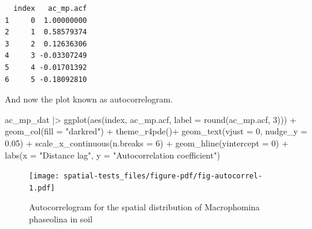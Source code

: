 \documentclass[
  letterpaper,
]{book}
\newenvironment{Shaded}{\begin{snugshade}}{\end{snugshade}}
\newcommand{\AttributeTok}[1]{\textcolor[rgb]{0.40,0.45,0.13}{#1}}
\newcommand{\DecValTok}[1]{\textcolor[rgb]{0.68,0.00,0.00}{#1}}
\newcommand{\FloatTok}[1]{\textcolor[rgb]{0.68,0.00,0.00}{#1}}
\newcommand{\FunctionTok}[1]{\textcolor[rgb]{0.28,0.35,0.67}{#1}}
\newcommand{\NormalTok}[1]{\textcolor[rgb]{0.00,0.23,0.31}{#1}}
\newcommand{\OtherTok}[1]{\textcolor[rgb]{0.00,0.23,0.31}{#1}}
\newcommand{\SpecialCharTok}[1]{\textcolor[rgb]{0.37,0.37,0.37}{#1}}
\newcommand{\StringTok}[1]{\textcolor[rgb]{0.13,0.47,0.30}{#1}}
\begin{document}
\begin{Shaded}
\end{Shaded}

\begin{verbatim}
  index   ac_mp.acf
1     0  1.00000000
2     1  0.58579374
3     2  0.12636306
4     3 -0.03307249
5     4 -0.01701392
6     5 -0.18092810
\end{verbatim}

And now the plot known as autocorrelogram.

\begin{Shaded}
\begin{Highlighting}[]
\NormalTok{ac\_mp\_dat }\SpecialCharTok{|\textgreater{}}
  \FunctionTok{ggplot}\NormalTok{(}\FunctionTok{aes}\NormalTok{(index, ac\_mp.acf, }\AttributeTok{label =} \FunctionTok{round}\NormalTok{(ac\_mp.acf, }\DecValTok{3}\NormalTok{))) }\SpecialCharTok{+}
  \FunctionTok{geom\_col}\NormalTok{(}\AttributeTok{fill =} \StringTok{"darkred"}\NormalTok{) }\SpecialCharTok{+}
  \FunctionTok{theme\_r4pde}\NormalTok{()}\SpecialCharTok{+}
  \FunctionTok{geom\_text}\NormalTok{(}\AttributeTok{vjust =} \DecValTok{0}\NormalTok{, }\AttributeTok{nudge\_y =} \FloatTok{0.05}\NormalTok{) }\SpecialCharTok{+}
  \FunctionTok{scale\_x\_continuous}\NormalTok{(}\AttributeTok{n.breaks =} \DecValTok{6}\NormalTok{) }\SpecialCharTok{+}
  \FunctionTok{geom\_hline}\NormalTok{(}\AttributeTok{yintercept =} \DecValTok{0}\NormalTok{) }\SpecialCharTok{+}
  \FunctionTok{labs}\NormalTok{(}\AttributeTok{x =} \StringTok{"Distance lag"}\NormalTok{, }\AttributeTok{y =} \StringTok{"Autocorrelation coefficient"}\NormalTok{)}
\end{Highlighting}
\end{Shaded}

\begin{figure}[H]

\texttt{[image: spatial-tests\_files/figure-pdf/fig-autocorrel-1.pdf]} \hfill{}

\caption{\label{fig-autocorrel}Autocorrelogram for the spatial
distribution of Macrophomina phaseolina in soil}

\end{figure}
\end{document}
